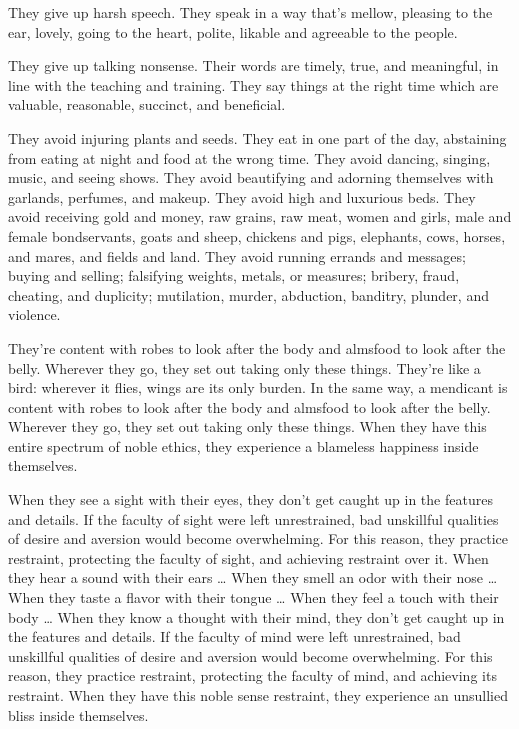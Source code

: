 \documentclass[12pt,openany]{book}%
\begin{document}
They give up harsh speech. They speak in a way that’s mellow, pleasing to the ear, lovely, going to the heart, polite, likable and agreeable to the people. 

They give up talking nonsense. Their words are timely, true, and meaningful, in line with the teaching and training. They say things at the right time which are valuable, reasonable, succinct, and beneficial. 

They avoid injuring plants and seeds. They eat in one part of the day, abstaining from eating at night and food at the wrong time. They avoid dancing, singing, music, and seeing shows. They avoid beautifying and adorning themselves with garlands, perfumes, and makeup. They avoid high and luxurious beds. They avoid receiving gold and money, raw grains, raw meat, women and girls, male and female bondservants, goats and sheep, chickens and pigs, elephants, cows, horses, and mares, and fields and land. They avoid running errands and messages; buying and selling; falsifying weights, metals, or measures; bribery, fraud, cheating, and duplicity; mutilation, murder, abduction, banditry, plunder, and violence. 

They’re content with robes to look after the body and almsfood to look after the belly. Wherever they go, they set out taking only these things. They’re like a bird: wherever it flies, wings are its only burden. In the same way, a mendicant is content with robes to look after the body and almsfood to look after the belly. Wherever they go, they set out taking only these things. When they have this entire spectrum of noble ethics, they experience a blameless happiness inside themselves. 

When they see a sight with their eyes, they don’t get caught up in the features and details. If the faculty of sight were left unrestrained, bad unskillful qualities of desire and aversion would become overwhelming. For this reason, they practice restraint, protecting the faculty of sight, and achieving restraint over it. When they hear a sound with their ears … When they smell an odor with their nose … When they taste a flavor with their tongue … When they feel a touch with their body … When they know a thought with their mind, they don’t get caught up in the features and details. If the faculty of mind were left unrestrained, bad unskillful qualities of desire and aversion would become overwhelming. For this reason, they practice restraint, protecting the faculty of mind, and achieving its restraint. When they have this noble sense restraint, they experience an unsullied bliss inside themselves. 
\end{document}
